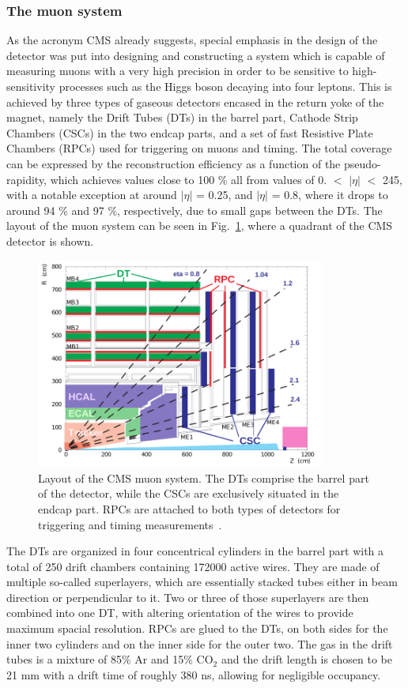 \subsubsection*{The muon system}
As the acronym CMS already suggests, special emphasis in the design of the detector was put into designing and constructing a system
which is capable of measuring muons with a very high precision in order to be sensitive to high-sensitivity processes such as
the Higgs boson decaying into four leptons. This is achieved by three types of gaseous detectors encased in the return yoke of the magnet, namely
the Drift Tubes (DTs) in the barrel part, Cathode Strip Chambers (CSCs) in the two endcap parts, and a set of fast Resistive Plate Chambers (RPCs) 
used for triggering on muons and timing. The total coverage can be expressed by the reconstruction efficiency as a function of the pseudo-rapidity,
which achieves values close to 100 \% all from values of 0. $<$ $|\eta|$ $<$ 245, with a notable exception at around $|\eta|$ = 0.25, and $|\eta|$ = 0.8, where it
drops to around 94 \% and 97 \%, respectively, due to small gaps between the DTs. The layout of the muon system can be seen in Fig.~\ref{fig:muons}, where 
a quadrant of the CMS detector is shown.

\begin{figure}[h!]
    \centering
    \includegraphics[width=0.85\textwidth]{../figs/muon_system.png}
    \caption{Layout of the CMS muon system. The DTs comprise the barrel part of the detector, while the CSCs are exclusively
situated in the endcap part. RPCs are attached to both types of detectors for triggering and timing measurements~\cite{muonsystem}.}
    \label{fig:muons}
\end{figure}

The DTs are organized in four concentrical cylinders in the barrel part with a total of 250 drift chambers containing \num{172000} active wires.
They are made of multiple so-called superlayers, which are essentially stacked tubes either in beam direction or perpendicular to it. Two or three
of those superlayers are then combined into one DT, with altering orientation of the wires to provide maximum spacial resolution. RPCs are glued to the DTs, on both sides for the
inner two cylinders and on the inner side for the outer two. The gas in the 
drift tubes is a mixture of 85\% Ar and 15\% CO$_2$ and the drift length is chosen to be 21 \si{\milli\meter} with a drift time of roughly 380 \si{\nano\second},
allowing for negligible occupancy.

